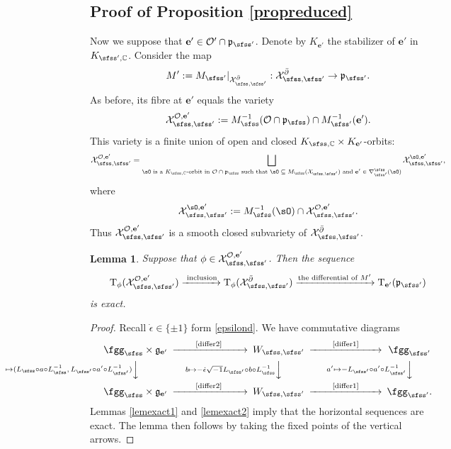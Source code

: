 \documentclass[11pt,a4paper]{amsart}
\newcommand{\CO}{{\mathcal {O}}}
\newcommand{\CX}{{\mathcal {X}}}
\newcommand{\g}{\mathfrak g}
\newcommand{\p}{\mathfrak p}
\newcommand{\be}{\begin {equation}}
\newcommand{\ee}{\end {equation}}
\numberwithin{equation}{section}
\newtheorem{lem}[thm]{Lemma}
\theoremstyle{remark}
\def\subset{\subseteq}
\begin{document}
\subsection{Proof of Proposition \ref{propreduced}} \label{secpp}

Now we suppose that $\mathbf e'\in \CO'\cap \p_{\sfss'}$. Denote by $K_{\mathbf e'}$ the stabilizer of $\mathbf e'$ in $K_{\sfss',\C}$. Consider the map
\[
 M':=  M_{\sfss'}|_{\CX_{\sfss, \sfss'}^{\bar \partial}} : \CX_{\sfss, \sfss'}^{\bar \partial}\rightarrow \p_{\sfss'}.
\]
As before, its fibre at $\mathbf e'$ equals the variety
\[
\CX_{\sfss, \sfss'}^{\CO, \mathbf e'}:=M_{\sfss}^{-1}(\CO\cap \p_\sfss)\cap  M_{\sfss'}^{-1}(\mathbf e').
\]
This variety is a finite union of open and closed
$K_{\sfss,\C}\times K_{\mathbf e'}$-orbits:
\[
   \CX_{\sfss, \sfss'}^{\CO, \mathbf e'}=\bigsqcup_{\sO\textrm{ is a   $K_{\sfss, \C}$-orbit in $ \CO\cap \p_\sfss$ such that $\sO\subset M_\sfss(\CX_{\sfss, \sfss'})$ and $\mathbf e'\in \nabla^\sfss_{\sfss'}(\sO)$}}  \CX_{\sfss, \sfss'}^{\sO, \mathbf e'},
 \]
 where
 \[
   \CX_{\sfss, \sfss'}^{\sO, \mathbf e'}:=M_\sfss^{-1}(\sO)\cap \CX_{\sfss, \sfss'}^{\CO, \mathbf e'}.
 \]
Thus  $\CX_{\sfss, \sfss'}^{\CO, \mathbf e'}$ is a smooth closed subvariety of $\CX_{\sfss, \sfss'}^{\bar \partial}$.

\begin{lem}\label{jacobic22}
Suppose that  $\phi\in \CX_{\sfss, \sfss'}^{\CO, \mathbf e'}$. Then the sequence
\be\label{jc111}
    \mathrm T_\phi (\CX_{\sfss, \sfss'}^{\CO, \mathbf e'})\xrightarrow{\textrm{ inclusion}} \mathrm T_\phi(\CX_{\sfss, \sfss'}^{\bar \partial})\xrightarrow{\textrm{the differential of $M'$}} \mathrm T_{\mathbf e'}(\p_{\sfss'})
\ee
is exact.
\end{lem}
\begin{proof}
Recall $\dot \epsilon\in \{\pm 1\}$ form \eqref{epsilond}. We have commutative diagrams
\[
 \begin{CD}
 \fggs \times  \g_{\mathbf e'} @>  \qquad  \textrm{\eqref{differ2} }\qquad  >>  W_{\sfss, \sfss'}
  @> \qquad  \textrm{\eqref{differ1}} \qquad  >>\fggsp\\
  @V(a,\,a') \mapsto  (L_\sfss\circ a \circ L_{\sfss}^{-1},\,  L_{\sfss'} \circ a' \circ L_{\sfss'}^{-1}) VV  @V b\mapsto - \dot \epsilon \sqrt{-1} L_{\sfss'}\circ b \circ L_\sfss^{-1} VV
  @V a' \mapsto - L_{\sfss'} \circ a' \circ L_{\sfss'}^{-1} VV \\
\fggs \times  \g_{\mathbf e'} @> \qquad   \textrm{\eqref{differ2} }\qquad  >>  W_{\sfss, \sfss'}
  @>\qquad  \textrm{\eqref{differ1}} \qquad  >> \fggsp.
\end{CD}
\]
Lemmas \ref{lemexact1} and \ref{lemexact2} imply that the horizontal sequences are exact. The lemma then follows by taking the fixed points of the vertical arrows.
\end{proof}
\end{document}
